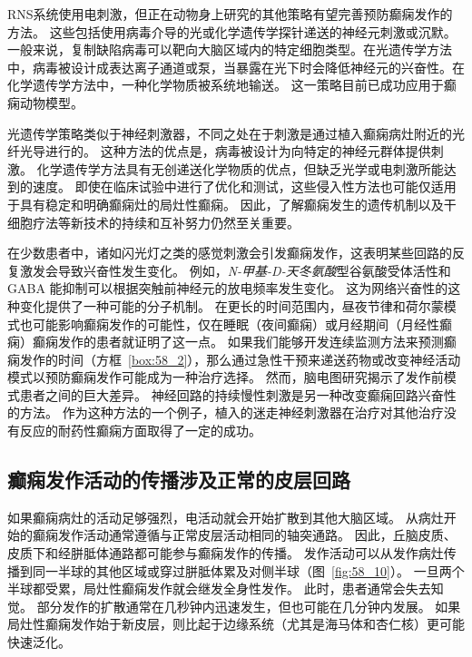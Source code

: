 \begin{proposition}[实时检测和预防癫痫的新方法]
	\quad \quad RNS系统使用电刺激，但正在动物身上研究的其他策略有望完善预防癫痫发作的方法。
	这些包括使用病毒介导的光或化学遗传学探针递送的神经元刺激或沉默。
	一般来说，复制缺陷病毒可以靶向大脑区域内的特定细胞类型。在光遗传学方法中，病毒被设计成表达离子通道或泵，当暴露在光下时会降低神经元的兴奋性。在化学遗传学方法中，一种化学物质被系统地输送。
	这一策略目前已成功应用于癫痫动物模型。
	
	\quad \quad 光遗传学策略类似于神经刺激器，不同之处在于刺激是通过植入癫痫病灶附近的光纤光导进行的。
	这种方法的优点是，病毒被设计为向特定的神经元群体提供刺激。
	化学遗传学方法具有无创递送化学物质的优点，但缺乏光学或电刺激所能达到的速度。
	即使在临床试验中进行了优化和测试，这些侵入性方法也可能仅适用于具有稳定和明确癫痫灶的局灶性癫痫。
	因此，了解癫痫发生的遗传机制以及干细胞疗法等新技术的持续和互补努力仍然至关重要。
	
\end{proposition}



在少数患者中，诸如闪光灯之类的感觉刺激会引发癫痫发作，这表明某些回路的反复激发会导致兴奋性发生变化。
例如，\textit{N-甲基-D-天冬氨酸}型谷氨酸受体活性和 GABA 能抑制可以根据突触前神经元的放电频率发生变化。
这为网络兴奋性的这种变化提供了一种可能的分子机制。
在更长的时间范围内，昼夜节律和荷尔蒙模式也可能影响癫痫发作的可能性，仅在睡眠（夜间癫痫）或月经期间（月经性癫痫）癫痫发作的患者就证明了这一点。
如果我们能够开发连续监测方法来预测癫痫发作的时间（方框~\ref{box:58_2}），那么通过急性干预来递送药物或改变神经活动模式以预防癫痫发作可能成为一种治疗选择。
然而，脑电图研究揭示了发作前模式患者之间的巨大差异。
神经回路的持续慢性刺激是另一种改变癫痫回路兴奋性的方法。
作为这种方法的一个例子，植入的迷走神经刺激器在治疗对其他治疗没有反应的耐药性癫痫方面取得了一定的成功。



\subsection{癫痫发作活动的传播涉及正常的皮层回路}

如果癫痫病灶的活动足够强烈，电活动就会开始扩散到其他大脑区域。
从病灶开始的癫痫发作活动通常遵循与正常皮层活动相同的轴突通路。
因此，丘脑皮质、皮质下和经胼胝体通路都可能参与癫痫发作的传播。
发作活动可以从发作病灶传播到同一半球的其他区域或穿过胼胝体累及对侧半球（图~\ref{fig:58_10}）。
一旦两个半球都受累，局灶性癫痫发作就会继发全身性发作。
此时，患者通常会失去知觉。
部分发作的扩散通常在几秒钟内迅速发生，但也可能在几分钟内发展。
如果局灶性癫痫发作始于新皮层，则比起于边缘系统（尤其是海马体和杏仁核）更可能快速泛化。


